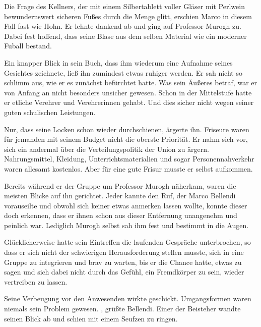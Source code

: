\par

 Die Frage des Kellners, der mit einem Silbertablett voller Gläser mit Perlwein bewundernswert sicheren Fußes durch die Menge glitt, erschien Marco in diesem Fall fast wie Hohn. Er lehnte dankend ab und ging auf Professor Murogh zu. Dabei fest hoffend, dass seine Blase aus dem selben Material wie ein moderner Fuball bestand.

\par

Ein knapper Blick in sein Buch, dass ihm wiederum eine Aufnahme seines Gesichtes zeichnete, ließ ihn zumindest etwas ruhiger werden. Er sah nicht so schlimm aus, wie er es zunächst befürchtet hatte. Was sein Äußeres betraf, war er von Anfang an nicht besonders unsicher gewesen. Schon in der Mittelstufe hatte er etliche Verehrer und Verehrerinnen gehabt. Und dies sicher nicht wegen seiner guten schulischen Leistungen.

\par

Nur, dass seine Locken schon wieder durchschienen, ärgerte ihn. Friseure waren für jemanden mit seinem Budget nicht die oberste Priorität. Er nahm sich vor, sich ein andermal über die Verteilungspolitik der Union zu ärgern. Nahrungsmittel, Kleidung, Unterrichtsmaterialien und sogar Personennahverkehr waren allesamt kostenlos. Aber für eine gute Frisur musste er selbst aufkommen.

\par

Bereits während er der Gruppe um Professor Murogh näherkam, waren die meisten Blicke auf ihn gerichtet. Jeder kannte den Ruf, der Marco Bellendi vorauseilte und obwohl sich keiner etwas anmerken lassen wollte, konnte dieser doch erkennen, dass er ihnen schon aus dieser Entfernung unangenehm und peinlich war. Lediglich Murogh selbst sah ihm fest und bestimmt in die Augen.

\par

Glücklicherweise hatte sein Eintreffen die laufenden Gespräche unterbrochen, so dass er sich nicht der schwierigen Herausforderung stellen musste, sich in eine Gruppe zu integrieren und brav zu warten, bis er die Chance hatte, etwas zu sagen und sich dabei nicht durch das Gefühl, ein Fremdkörper zu sein, wieder vertreiben zu lassen.

\par

Seine Verbeugung vor den Anwesenden wirkte geschickt. Umgangsformen waren niemals sein Problem gewesen. , grüßte Bellendi.  Einer der Beisteher wandte seinen Blick ab und schien mit einem Seufzen zu ringen.

